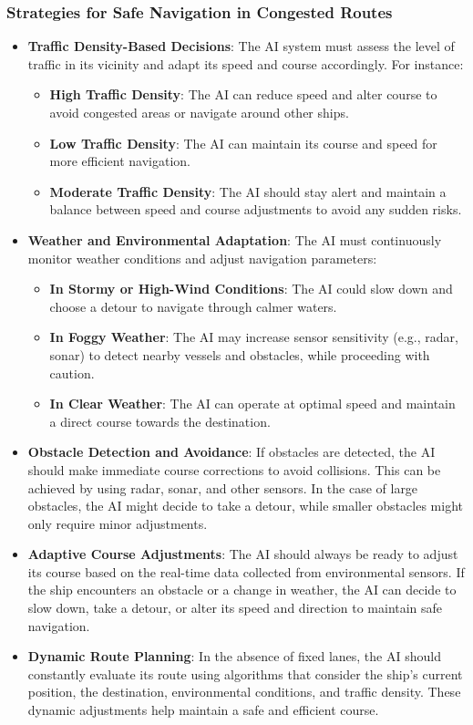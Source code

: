 \documentclass{article}
\begin{document}
\subsubsection{\large Strategies for Safe Navigation in Congested Routes}
\begin{itemize}
    \item \textbf{Traffic Density-Based Decisions}: The AI system must assess the level of traffic in its vicinity and adapt its speed and course accordingly. For instance:
    \begin{itemize}
        \item \textbf{High Traffic Density}: The AI can reduce speed and alter course to avoid congested areas or navigate around other ships.
        \item \textbf{Low Traffic Density}: The AI can maintain its course and speed for more efficient navigation.
        \item \textbf{Moderate Traffic Density}: The AI should stay alert and maintain a balance between speed and course adjustments to avoid any sudden risks.
    \end{itemize}
    \item \textbf{Weather and Environmental Adaptation}: The AI must continuously monitor weather conditions and adjust navigation parameters:
    \begin{itemize}
        \item \textbf{In Stormy or High-Wind Conditions}: The AI could slow down and choose a detour to navigate through calmer waters.
        \item \textbf{In Foggy Weather}: The AI may increase sensor sensitivity (e.g., radar, sonar) to detect nearby vessels and obstacles, while proceeding with caution.
        \item \textbf{In Clear Weather}: The AI can operate at optimal speed and maintain a direct course towards the destination.
    \end{itemize}
    \item \textbf{Obstacle Detection and Avoidance}: If obstacles are detected, the AI should make immediate course corrections to avoid collisions. This can be achieved by using radar, sonar, and other sensors. In the case of large obstacles, the AI might decide to take a detour, while smaller obstacles might only require minor adjustments.
    \item \textbf{Adaptive Course Adjustments}: The AI should always be ready to adjust its course based on the real-time data collected from environmental sensors. If the ship encounters an obstacle or a change in weather, the AI can decide to slow down, take a detour, or alter its speed and direction to maintain safe navigation.
    \item \textbf{Dynamic Route Planning}: In the absence of fixed lanes, the AI should constantly evaluate its route using algorithms that consider the ship’s current position, the destination, environmental conditions, and traffic density. These dynamic adjustments help maintain a safe and efficient course.
\end{itemize}
\end{document}
